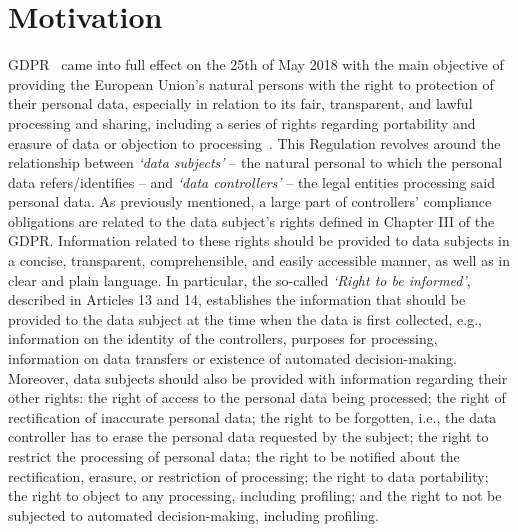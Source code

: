 \section{Motivation}
\label{sec:motivation}

GDPR~\citeyearpar{noauthor_regulation_2016} came into full effect on the 25th of May 2018 with the main objective of providing the European Union’s natural persons with the right to protection of their personal data, especially in relation to its fair, transparent, and lawful processing and sharing, including a series of rights regarding portability and erasure of data or objection to processing~\citep{ausloos_getting_2019}.
This Regulation revolves around the relationship between \textit{`data subjects'} -- the natural personal to which the personal data refers/identifies -- and \textit{`data controllers'} -- the legal entities processing said personal data.
As previously mentioned, a large part of controllers' compliance obligations are related to the data subject’s rights defined in Chapter III of the GDPR.
Information related to these rights should be provided to data subjects in a concise, transparent, comprehensible, and easily accessible manner, as well as in clear and plain language.
In particular, the so-called \textit{`Right to be informed'}, described in Articles 13 and 14, establishes the information that should be provided to the data subject at the time when the data is first collected, e.g., information on the identity of the controllers, purposes for processing, information on data transfers or existence of automated decision-making.
Moreover, data subjects should also be provided with information regarding their other rights:
the right of access to the personal data being processed;
the right of rectification of inaccurate personal data;
the right to be forgotten, i.e., the data controller has to erase the personal data requested by the subject;
the right to restrict the processing of personal data;
the right to be notified about the rectification, erasure, or restriction of processing;
the right to data portability;
the right to object to any processing, including profiling;
and the right to not be subjected to automated decision-making, including profiling.

